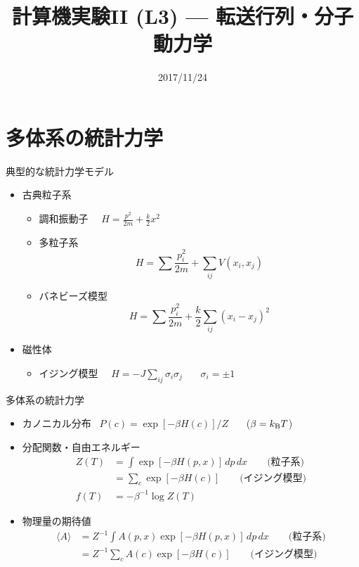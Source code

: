 \documentclass[dvipdfmx]{beamer}
\title{計算機実験II (L3) --- 転送行列・分子動力学}
\date{2017/11/24}
\begin{document}
\begin{frame}
  \titlepage
  \tableofcontents
\end{frame}

\section{多体系の統計力学}

\begin{frame}[t,fragile]{典型的な統計力学モデル}
  \begin{itemize}
  \item 古典粒子系
    \begin{itemize}
    \item 調和振動子 \ \ $\displaystyle H = \frac{p^2}{2m} + \frac{k}{2}x^2$
    \item 多粒子系
      \[
      H = \sum \frac{p_i^2}{2m} + \sum_{ij} V(x_i, x_j)
      \]
    \item バネビーズ模型
      \[
      H = \sum \frac{p_i^2}{2m} + \frac{k}{2} \sum_{ij} (x_i-x_j)^2
      \]
  \end{itemize}
  \item 磁性体
    \begin{itemize}
    \item イジング模型 \ \ $\displaystyle H = -J \sum_{ij} \sigma_i \sigma_j$ \ \ \ $\sigma_i = \pm 1$
    \end{itemize}
  \end{itemize}
\end{frame}

\begin{frame}[t,fragile]{多体系の統計力学}
  \begin{itemize}
    \setlength{\itemsep}{1em}
  \item カノニカル分布 \ $P(c) = \exp [- \beta H(c) ] / Z$ \ \ \ ($\beta = k_{\rm B} T$)
  \item 分配関数・自由エネルギー
    \begin{align*}
      Z(T) &= \int \exp [- \beta H(p,x) ] \, dp \, dx \qquad \text{(粒子系)} \\
      &= \sum_c \exp [- \beta H(c) ] \qquad \text{(イジング模型)} \\
      f(T) &= - \beta^{-1} \log Z(T)
    \end{align*}
  \item 物理量の期待値
    \begin{align*}
      \langle A \rangle &= Z^{-1} \int A(p,x) \exp [- \beta H(p,x) ] \, dp \, dx \qquad \text{(粒子系)} \\
      &= Z^{-1} \sum_c A(c) \exp [- \beta H(c) ] \qquad \text{(イジング模型)}
    \end{align*}
  \end{itemize}
\end{frame}
\end{document}
